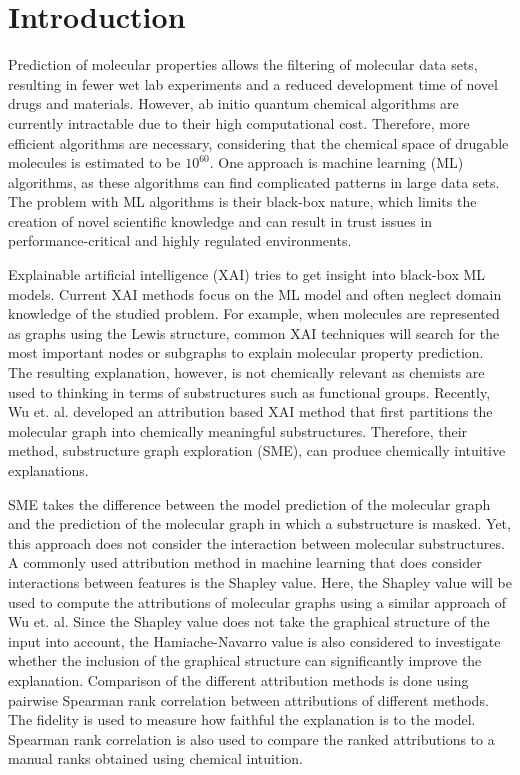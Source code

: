 \chapter{Introduction}


Prediction of molecular properties allows the filtering of molecular data sets, 
resulting in fewer wet lab experiments and a reduced development time of novel 
drugs and materials.\cite{adelusi2022molecular} However, ab initio quantum chemical algorithms are currently 
intractable due to their high computational cost.\cite{szabo2012modern} Therefore, more efficient 
algorithms are necessary, considering that the chemical space of drugable molecules 
is estimated to be $10^{60}$. One approach is machine learning (ML) algorithms, as these 
algorithms can find complicated patterns in large data sets.\cite{gorgulla2022emerging} The problem with ML 
algorithms is their black-box nature, which limits the creation of novel scientific 
knowledge and can result in trust issues in performance-critical and highly regulated 
environments.\cite{carvalho2019machine}


Explainable artificial intelligence (XAI) tries to get insight into black-box 
ML models.\cite{carvalho2019machine, yuan2022explainability} 
Current XAI methods focus on the ML model and often neglect domain 
knowledge of the studied problem. For example, when molecules are represented 
as graphs using the Lewis structure\cite{ahmad1992drawing}, common XAI techniques will search for the 
most important nodes or subgraphs to explain molecular property prediction.\cite{wu2023chemistry} The 
resulting explanation, however, is not chemically relevant as chemists are used 
to thinking in terms of substructures such as functional groups. Recently, Wu et. 
al. developed an attribution based XAI method that first partitions the molecular graph into 
chemically meaningful substructures. Therefore, their method, substructure graph 
exploration (SME), can produce chemically intuitive explanations.\cite{wu2023chemistry}


SME takes the difference between the model prediction of the molecular graph and 
the prediction of the molecular graph in which a substructure is masked. Yet, 
this approach does not consider the interaction between molecular substructures.
A commonly used attribution method in machine learning that does consider 
interactions between features is the Shapley value. Here, the Shapley value\cite{shapley1953value} will 
be used to compute the attributions of molecular graphs using a similar approach 
of Wu et. al. Since the Shapley value does not take the graphical structure of 
the input into account, the Hamiache-Navarro value\cite{hamiache_value_1999} 
is also considered to investigate whether the inclusion of the graphical structure 
can significantly improve the explanation. Comparison of the different attribution 
methods is done using pairwise Spearman rank correlation between attributions of 
different methods. The fidelity\cite{carvalho2019machine} is used to measure 
how faithful the explanation is to the model. Spearman rank correlation is also 
used to compare the ranked attributions to a manual ranks obtained using chemical 
intuition. 


